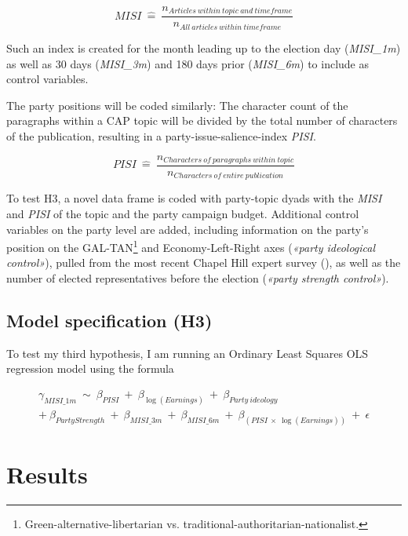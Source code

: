 \documentclass[11pt,a4paper]{article}
\begin{document}
\begin{equation}
    MISI\ \widehat{=}\ \frac{n_{Articles\ within\ topic\ and\ timeframe}}{n_{All\ articles\ within\ timeframe}}
\end{equation}

Such an index is created for the month leading up to the election day (\textit{MISI\_1m}) as well as 30 days (\textit{MISI\_3m}) and 180 days prior (\textit{MISI\_6m}) to include as control variables.

The party positions will be coded similarly: The character count of the paragraphs within a CAP topic will be divided by the total number of characters of the publication, resulting in a party-issue-salience-index \textit{PISI}.

\begin{equation}
    PISI\ \widehat{=}\ \frac{n_{Characters\ of\ paragraphs\ within\ topic}}{n_{Characters\ of\ entire\ publication}}
\end{equation}

To test H3, a novel data frame is coded with party-topic dyads with the \textit{MISI} and \textit{PISI} of the topic and the party campaign budget. Additional control variables on the party level are added, including information on the party’s position on the GAL-TAN\footnote{Green-alternative-libertarian vs. traditional-authoritarian-nationalist.} and Economy-Left-Right axes (\textit{«party ideological control»}), pulled from the most recent Chapel Hill expert survey (\cite{jolly_chapel_2022}), as well as the number of elected representatives before the election (\textit{«party strength control»}). 


\subsection{Model specification (H3)}
To test my third hypothesis, I am running an Ordinary Least Squares OLS regression model using the formula

\begin{equation}
    \begin{split}
        \gamma_{MISI\_1m}\ \sim\ \beta_{PISI}\ +\ \beta_{\log(Earnings)}\ +\ \beta_{Party\ ideology}\\
         +\ \beta_{Party Strength}\ +\ \beta_{MISI\_3m}\ +\ \beta_{MISI\_6m}\ +\ \beta_{(PISI\ \times\ \log(Earnings)) }\ +\ \epsilon  
    \end{split}
\end{equation}


\section{Results}
\end{document}
